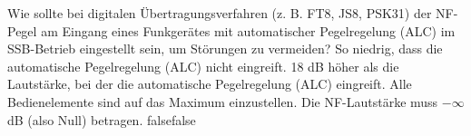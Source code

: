     {Wie sollte bei digitalen Übertragungsverfahren (z. B. FT8, JS8, PSK31) der NF-Pegel am Eingang eines Funkgerätes mit automatischer Pegelregelung (ALC) im SSB-Betrieb eingestellt sein, um Störungen zu vermeiden?}
    {So niedrig, dass die automatische Pegelregelung (ALC) nicht eingreift.}
    {18 dB höher als die Lautstärke, bei der die automatische Pegelregelung (ALC) eingreift.}
    {Alle Bedienelemente sind auf das Maximum einzustellen.}
    {Die NF-Lautstärke muss $-\infty$ dB (also Null) betragen.}
    {false}{false}